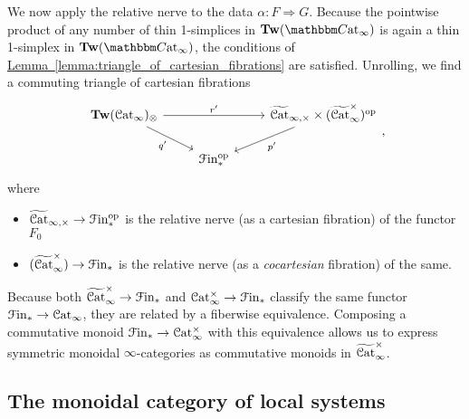 \documentclass[main.tex]{subfiles}
\begin{document}
We now apply the relative nerve to the data $\alpha\colon F \Rightarrow G$. Because the pointwise product of any number of thin 1-simplices in $\Tw(\ICCat)$ is again a thin 1-simplex in $\Tw(\ICCat)$, the conditions of \hyperref[lemma:triangle_of_cartesian_fibrations]{Lemma~\ref*{lemma:triangle_of_cartesian_fibrations}} are satisfied. Unrolling, we find a commuting triangle of cartesian fibrations
\begin{equation}
  \label{eq:base_triangle}
  \begin{tikzcd}
    \Tw(\ICat)_{\otimes}
    \arrow[rr, "r'"]
    \arrow[dr, swap, "q'"]
    && \TICatCart \times (\TICatCocart)\op
    \arrow[dl, "p'"]
    \\
    & \Finp\op
  \end{tikzcd},
\end{equation}
where
\begin{itemize}
  \item $\widetilde{\mathcal{C}\mathrm{at}}_{\infty,\times} \to \mathcal{F}\mathrm{in}_{*}^{\mathrm{op}}$ is the relative nerve (as a cartesian fibration) of the functor $F_{0}$

  \item $(\widetilde{\mathcal{C}\mathrm{at}}_{\infty}^{\times}) \to \mathcal{F}\mathrm{in}_{*}$ is the relative nerve (as a \emph{cocartesian} fibration) of the same.
\end{itemize}

Because both $\widetilde{\mathcal{C}\mathrm{at}}_{\infty}^{\times} \to \mathcal{F}\mathrm{in}_{*}$ and $\mathcal{C}\mathrm{at}_{\infty}^{\times} \to \mathcal{F}\mathrm{in}_{*}$ classify the same functor $\mathcal{F}\mathrm{in}_{*} \to \mathcal{C}\mathrm{at}_{\infty}$, they are related by a fiberwise equivalence. Composing a commutative monoid $\mathcal{F}\mathrm{in}_{*} \to \mathcal{C}\mathrm{at}_{\infty}^{\times}$ with this equivalence allows us to express symmetric monoidal $\infty$-categories as commutative monoids in $\widetilde{\mathcal{C}\mathrm{at}}_{\infty}^{\times}$.

\subsection{The monoidal category of local systems}
\label{ssc:the_monoidal_category_of_local_systems}
\end{document}
